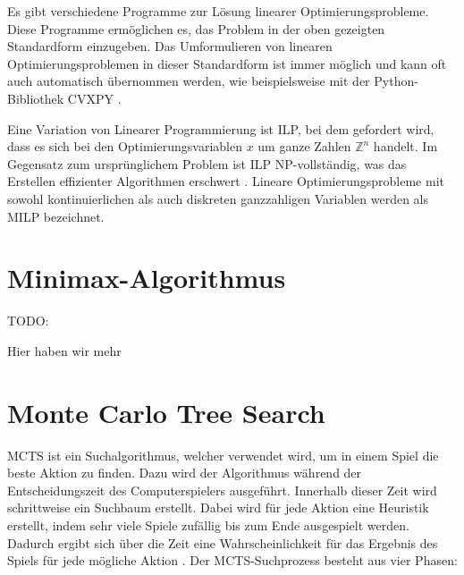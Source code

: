 Es gibt verschiedene Programme zur Lösung linearer Optimierungsprobleme. Diese Programme ermöglichen es, das Problem in der oben gezeigten Standardform einzugeben. Das Umformulieren von linearen Optimierungsproblemen in dieser Standardform ist immer möglich und kann oft auch automatisch übernommen werden, wie beispielsweise mit der Python-Bibliothek CVXPY \cite[S. 1]{2016.CVXPY}.

Eine Variation von Linearer Programmierung ist \ac{ILP}, bei dem gefordert wird, dass es sich bei den Optimierungsvariablen $x$ um ganze Zahlen $\mathbb{Z}^{n}$ handelt. Im Gegensatz zum ursprünglichem Problem ist \ac{ILP} NP-vollständig, was das Erstellen effizienter Algorithmen erschwert \cite[S. 173]{2002.MathProgramming}. Lineare Optimierungsprobleme mit sowohl kontinuierlichen als auch diskreten ganzzahligen Variablen werden als \ac{MILP} bezeichnet.

\section{Minimax-Algorithmus}
\label{chapter:minimax-algorithmus}

TODO:

Hier haben wir mehr

\section{Monte Carlo Tree Search}
\label{chapter:monte-carlo-tree-search}

\acf{MCTS} ist ein Suchalgorithmus, welcher verwendet wird, um in einem Spiel die beste Aktion zu finden. Dazu wird der Algorithmus während der Entscheidungszeit des Computerspielers ausgeführt. Innerhalb dieser Zeit wird schrittweise ein Suchbaum erstellt. Dabei wird für jede Aktion eine Heuristik erstellt, indem sehr viele Spiele zufällig bis zum Ende ausgespielt werden. Dadurch ergibt sich über die Zeit eine Wahrscheinlichkeit für das Ergebnis des Spiels für jede mögliche Aktion \cite[S. 61]{2008.ParallelMCTS}. Der \ac{MCTS}-Suchprozess besteht aus vier Phasen:


